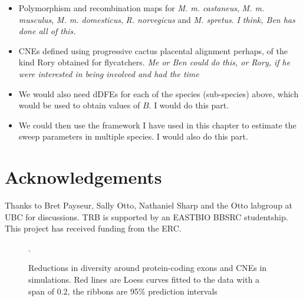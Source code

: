 \documentclass[11pt]{article}
\newcommand{\beginsupplement}{%
        \setcounter{table}{0}
        \renewcommand{\thetable}{S\arabic{table}}%
        \setcounter{figure}{0}
        \renewcommand{\thefigure}{S\arabic{figure}}%
     }
\begin{document}
\begin{itemize}

\item Polymorphism and recombination maps for \textit{M. m. castaneus}, \textit{M. m. musculus}, \textit{M. m. domesticus}, \textit{R. norvegicus} and \textit{M. spretus}. \textit{I think, Ben has done all of this.}

\item CNEs defined using progressive cactus placental alignment perhaps, of the kind Rory obtained for flycatchers. \textit{Me or Ben could do this, or Rory, if he were interested in being involved and had the time}

\item We would also need dDFEs for each of the species (sub-species) above, which would be used to obtain values of $B$. I would do this part.

\item We could then use the framework I have used in this chapter to estimate the sweep parameters in multiple species. I would also do this part.


\end{itemize}



\section*{Acknowledgements}

Thanks to Bret Payseur, Sally Otto, Nathaniel Sharp and the Otto labgroup at UBC for discussions. TRB is supported by an EASTBIO BBSRC studentship. This project has received funding from the ERC.

 
%

\beginsupplement

\newpage











%


\begin{figure}[h]
   \centering      
   \noindent{}
 \caption{Reductions in diversity around protein-coding exons and CNEs in simulations. Red lines are Loess curves fitted to the data with a span of 0.2, the ribbons are 95\% prediction intervals}.
 
 \label{fig:BGSLoess}
\end{figure}
\end{document}
